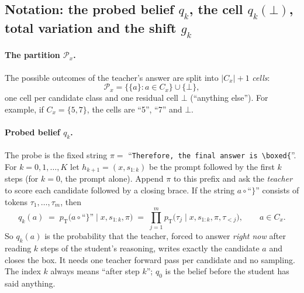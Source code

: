 \documentclass[11pt]{article}
\theoremstyle{definition}
\theoremstyle{remark}
\newcommand{\pT}{p_{\mathrm{T}}}
\newcommand{\other}{\bot}
\begin{document}
\subsection{Notation: the probed belief $q_k$, the cell $q_k(\other)$, total variation and the shift $g_k$}
\label{sec:notation}

\paragraph{The partition $\mathcal P_x$.}
The possible outcomes of the teacher's answer are split into $|C_x|+1$ \emph{cells}:
\[
\mathcal P_x=\big\{\{a\}: a\in C_x\big\}\cup\{\other\},
\]
one cell per candidate class and one residual cell $\other$ (``anything else''). For example, if $C_x=\{5,7\}$, the cells are ``5'', ``7'' and $\other$.

\paragraph{Probed belief $q_k$.}
The probe is the fixed string $\pi=$ ``\verb|Therefore, the final answer is \boxed{|''. For $k=0,1,\dots,K$ let $h_{k+1}=(x,s_{1:k})$ be the prompt followed by the first $k$ steps (for $k=0$, the prompt alone). Append $\pi$ to this prefix and ask the \emph{teacher} to score each candidate followed by a closing brace. If the string $a\circ\text{``\}''}$ consists of tokens $\tau_1,\dots,\tau_m$, then
\begin{equation}
q_k(a)\;=\;\pT\big(a\circ\text{``\}''}\mid x,s_{1:k},\pi\big)\;=\;\prod_{j=1}^{m}\pT\big(\tau_j\mid x,s_{1:k},\pi,\tau_{<j}\big),\qquad a\in C_x.
\label{eq:qdef}
\end{equation}
So $q_k(a)$ is the probability that the teacher, forced to answer \emph{right now} after reading $k$ steps of the student's reasoning, writes exactly the candidate $a$ and closes the box. It needs one teacher forward pass per candidate and no sampling. The index $k$ always means ``after step $k$''; $q_0$ is the belief before the student has said anything.
\end{document}
